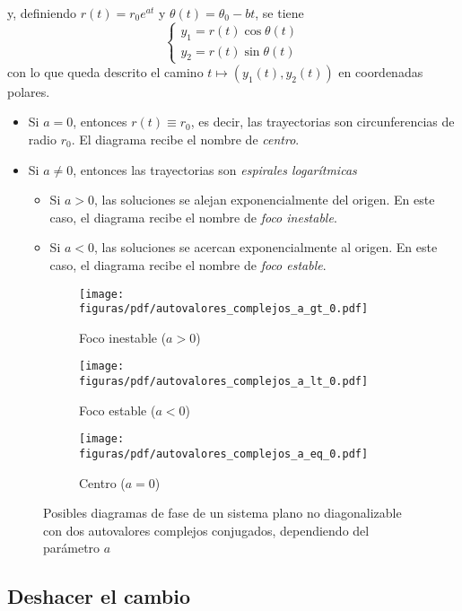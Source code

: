 \documentclass[../ecuaciones_diferenciales.tex]{subfiles}
\begin{document}
y, definiendo \(r(t) = r_0e^{at}\) y \(\theta(t) = \theta_0 - bt\), se tiene
\[
	\begin{cases}
		y_1 = r(t) \cos \theta(t) \\
		y_2 = r(t) \sin \theta(t)
	\end{cases}
\]
con lo que queda descrito el camino \(t \mapsto (y_1(t), y_2(t))\) en
coordenadas polares.

\begin{itemize}
	\item Si \(a = 0\), entonces \(r(t) \equiv r_0\), es decir, las trayectorias son
	      circunferencias de radio \(r_0\). El diagrama recibe el nombre de \emph{centro}.
	\item Si \(a \neq 0\), entonces las trayectorias son \emph{espirales logarítmicas}
	      \begin{itemize}
		      \item Si \(a > 0\), las soluciones se alejan exponencialmente del
		            origen. En este caso, el diagrama recibe el nombre de \emph{foco inestable}.
		      \item Si \(a < 0\), las soluciones se acercan exponencialmente al
		            origen. En este caso, el diagrama recibe el nombre de \emph{foco estable}.
	      \end{itemize}
\end{itemize}

\begin{figure}[ht]
	\centering
	\begin{subfigure}{0.33\textwidth}
		\centering
        \texttt{[image: figuras/pdf/autovalores\_complejos\_a\_gt\_0.pdf]}
		\caption*{Foco inestable (\(a > 0\))}
	\end{subfigure}%
	\begin{subfigure}{0.33\textwidth}
		\centering
        \texttt{[image: figuras/pdf/autovalores\_complejos\_a\_lt\_0.pdf]}
		\caption*{Foco estable (\(a < 0\))}
	\end{subfigure}%
	\begin{subfigure}{0.33\textwidth}
		\centering
        \texttt{[image: figuras/pdf/autovalores\_complejos\_a\_eq\_0.pdf]}
		\caption*{Centro (\(a = 0\))}
	\end{subfigure}
	\caption{Posibles diagramas de fase de un sistema plano no diagonalizable con 
	dos autovalores complejos conjugados, dependiendo del parámetro \(a\)}
\end{figure}

\subsection{Deshacer el cambio}
\end{document}
